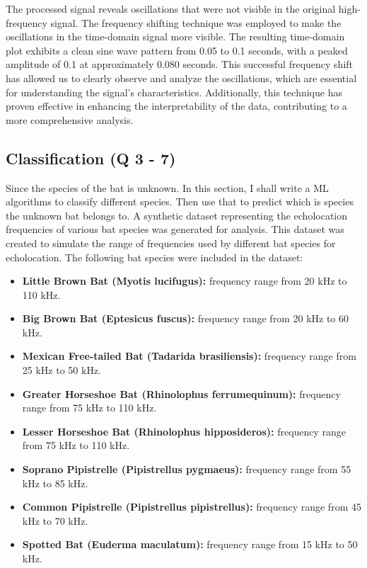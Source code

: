 \documentclass[12pt]{article}
\begin{document}
The processed signal reveals oscillations that were not visible in the original high-frequency signal. The frequency shifting technique was employed to make the oscillations in the time-domain signal more visible. The resulting time-domain plot exhibits a clean sine wave pattern from 0.05 to 0.1 seconds, with a peaked amplitude of 0.1 at approximately 0.080 seconds. This successful frequency shift has allowed us to clearly observe and analyze the oscillations, which are essential for understanding the signal's characteristics. Additionally, this technique has proven effective in enhancing the interpretability of the data, contributing to a more comprehensive analysis.

\subsection{Classification (Q 3 - 7)}
Since the species of the bat is unknown. In this section, I shall write a ML algorithms to classify different species. Then use that to predict which is species the unknown bat belongs to. A synthetic dataset representing the echolocation frequencies of various bat species was generated for analysis. This dataset was created to simulate the range of frequencies used by different bat species for echolocation. The following bat species were included in the dataset:

\begin{itemize}
    \item \textbf{Little Brown Bat (Myotis lucifugus):} frequency range from 20 kHz to 110 kHz.

    \item \textbf{Big Brown Bat (Eptesicus fuscus):} frequency range from 20 kHz to 60 kHz.

    \item \textbf{Mexican Free-tailed Bat (Tadarida brasiliensis):} frequency range from 25 kHz to 50 kHz.

    \item \textbf{Greater Horseshoe Bat (Rhinolophus ferrumequinum):} frequency range from 75 kHz to 110 kHz.

    \item \textbf{Lesser Horseshoe Bat (Rhinolophus hipposideros):} frequency range from 75 kHz to 110 kHz.

    \item \textbf{Soprano Pipistrelle (Pipistrellus pygmaeus):} frequency range from 55 kHz to 85 kHz.

    \item \textbf{Common Pipistrelle (Pipistrellus pipistrellus):} frequency range from 45 kHz to 70 kHz.

    \item \textbf{Spotted Bat (Euderma maculatum):} frequency range from 15 kHz to 50 kHz.
\end{itemize}
\end{document}
